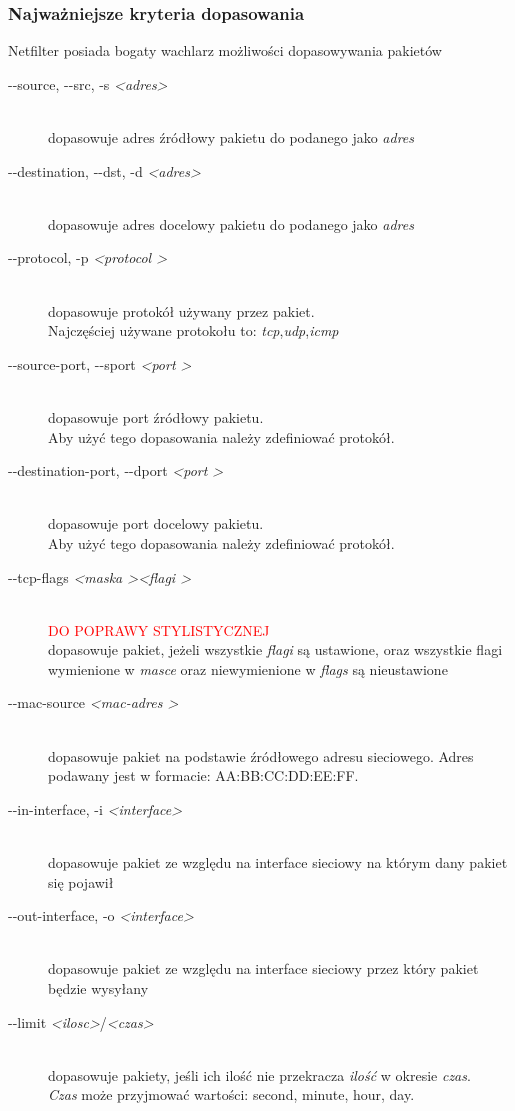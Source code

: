 \documentclass[a4paper,12pt]{book}
\newcommand{\param}[1]{\textit{\textless #1\textgreater}}
\begin{document}
			\subsubsection{Najważniejsze kryteria dopasowania}
				Netfilter posiada bogaty wachlarz możliwości dopasowywania pakietów
				\begin{description}
					\item[-{}-source, -{}-src, -s \param{adres} ] \hfill \\
						dopasowuje adres źródłowy pakietu do podanego jako \textit{adres}
					\item[-{}-destination, -{}-dst, -d \param{adres}] \hfill\\
						dopasowuje adres docelowy pakietu do podanego jako \textit{adres}
					\item[-{}-protocol, -p \textit{\textless protocol \textgreater}] \hfill \\
						dopasowuje protokół używany przez pakiet.\\
						Najczęściej używane protokołu to: \textit{tcp},\textit{udp},\textit{icmp}
					\item[-{}-source-port, -{}-sport \textit{\textless port \textgreater} ]\hfill\\
						dopasowuje port źródłowy pakietu.\\
						Aby użyć tego dopasowania należy zdefiniować protokół.
					\item[-{}-destination-port, -{}-dport \textit{\textless port \textgreater}] \hfill \\
						dopasowuje port docelowy pakietu.\\
						Aby użyć tego dopasowania należy zdefiniować protokół.
					\item[-{}-tcp-flags \textit{\textless maska \textgreater \textless flagi \textgreater}] \hfill \\
						\textcolor{red}{\Large{DO POPRAWY STYLISTYCZNEJ}}\\
						dopasowuje pakiet, jeżeli wszystkie \textit{flagi} są ustawione, oraz wszystkie flagi wymienione w \textit{masce} oraz niewymienione w \textit{flags} są nieustawione
					\item[-{}-mac-source \textit{\textless mac-adres \textgreater}] \hfill \\
						dopasowuje pakiet na podstawie źródłowego adresu sieciowego. Adres podawany jest w formacie: AA:BB:CC:DD:EE:FF.
					\item[-{}-in-interface, -i \param{interface}] \hfill \\
						dopasowuje pakiet ze względu na interface sieciowy na którym dany pakiet się pojawił	
					\item[-{}-out-interface, -o \param{interface}] \hfill \\
						dopasowuje pakiet ze względu na interface sieciowy przez który pakiet będzie wysyłany
					\item[-{}-limit \param{ilosc}/\param{czas}] \hfill \\
						dopasowuje pakiety, jeśli ich ilość nie przekracza \textit{ilość} w okresie \textit{czas}.\\
						\textit{Czas} może przyjmować wartości: second, minute, hour, day.
				\end{description}
\end{document}
